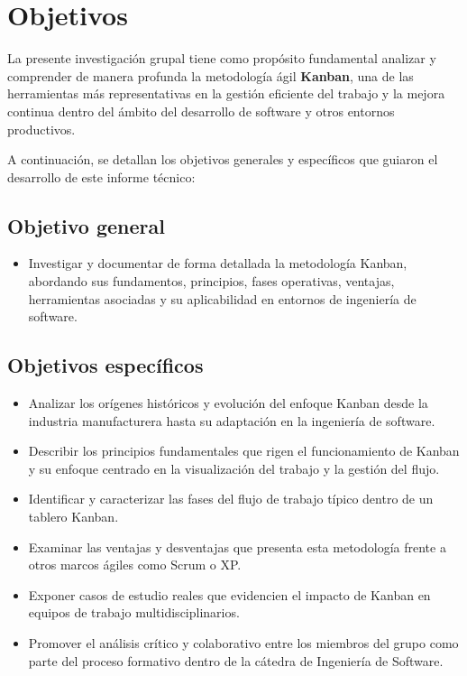 \section{Objetivos}

La presente investigación grupal tiene como propósito fundamental analizar y comprender de manera profunda la metodología ágil \textbf{Kanban}, una de las herramientas más representativas en la gestión eficiente del trabajo y la mejora continua dentro del ámbito del desarrollo de software y otros entornos productivos.

\vspace{0.5cm}
\noindent A continuación, se detallan los objetivos generales y específicos que guiaron el desarrollo de este informe técnico:

\subsection*{Objetivo general}
\begin{itemize}
    \item Investigar y documentar de forma detallada la metodología Kanban, abordando sus fundamentos, principios, fases operativas, ventajas, herramientas asociadas y su aplicabilidad en entornos de ingeniería de software.
\end{itemize}

\subsection*{Objetivos específicos}
\begin{itemize}
    \item Analizar los orígenes históricos y evolución del enfoque Kanban desde la industria manufacturera hasta su adaptación en la ingeniería de software.
    \item Describir los principios fundamentales que rigen el funcionamiento de Kanban y su enfoque centrado en la visualización del trabajo y la gestión del flujo.
    \item Identificar y caracterizar las fases del flujo de trabajo típico dentro de un tablero Kanban.
    \item Examinar las ventajas y desventajas que presenta esta metodología frente a otros marcos ágiles como Scrum o XP.
    \item Exponer casos de estudio reales que evidencien el impacto de Kanban en equipos de trabajo multidisciplinarios.
    \item Promover el análisis crítico y colaborativo entre los miembros del grupo como parte del proceso formativo dentro de la cátedra de Ingeniería de Software.
\end{itemize}
